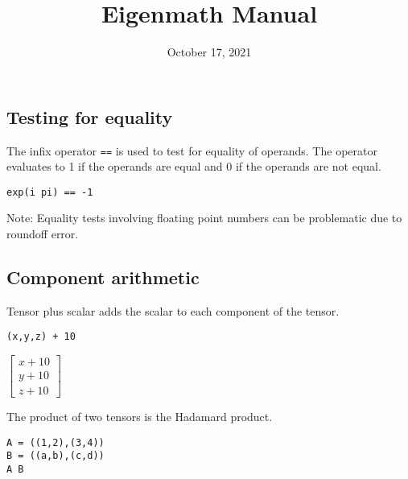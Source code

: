 \documentclass[12pt]{article}
\title{Eigenmath Manual}
\date{October 17, 2021}
\author{}
\begin{document}
\maketitle

\tableofcontents

\newpage





\subsection{Testing for equality}
The infix operator \verb$==$ is used to test for equality of operands.
The operator evaluates to 1 if the operands are equal and 0 if the operands are not equal.

\begin{Verbatim}[formatcom=\color{blue}]
exp(i pi) == -1
\end{Verbatim}


\bigskip
\noindent
Note: Equality tests involving floating point numbers
can be problematic due to roundoff error.











\subsection{Component arithmetic}

\noindent
Tensor plus scalar adds the scalar to each component of the tensor.

{\color{blue}\begin{verbatim}
(x,y,z) + 10
\end{verbatim}}

\noindent
$\begin{bmatrix}x+10\\y+10\\z+10\end{bmatrix}$

\bigskip
\noindent
The product of two tensors is the Hadamard product.

{\color{blue}\begin{verbatim}
A = ((1,2),(3,4))
B = ((a,b),(c,d))
A B
\end{verbatim}}
\end{document}

